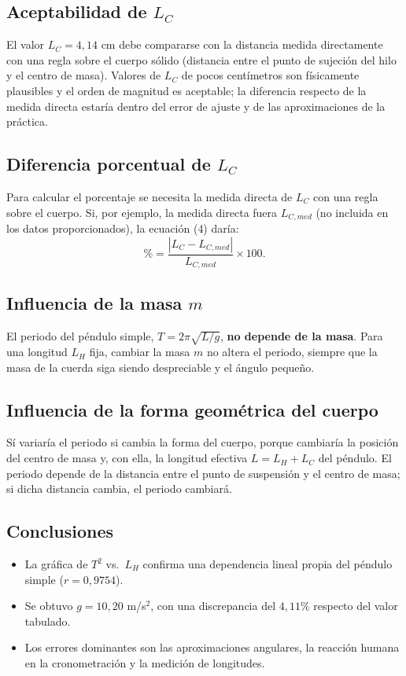 \documentclass[12pt,a4paper]{article}
\begin{document}
\subsection{Aceptabilidad de $L_C$}
El valor $L_C = 4,14$ cm debe compararse con la distancia medida directamente con una regla sobre el cuerpo s\'olido (distancia entre el punto de sujeci\'on del hilo y el centro de masa). Valores de $L_C$ de pocos cent\'imetros son f\'isicamente plausibles y el orden de magnitud es aceptable; la diferencia respecto de la medida directa estar\'ia dentro del error de ajuste y de las aproximaciones de la pr\'actica.

\subsection{Diferencia porcentual de $L_C$}
Para calcular el porcentaje se necesita la medida directa de $L_C$ con una regla sobre el cuerpo. Si, por ejemplo, la medida directa fuera $L_{C,med}$ (no incluida en los datos proporcionados), la ecuaci\'on (4) dar\'ia:
\begin{equation}
    \% = \frac{|L_C - L_{C,med}|}{L_{C,med}} \times 100.
\end{equation}

\subsection{Influencia de la masa $m$}
El periodo del p\'endulo simple, $T = 2\pi\sqrt{L/g}$, \textbf{no depende de la masa}. Para una longitud $L_H$ fija, cambiar la masa $m$ no altera el periodo, siempre que la masa de la cuerda siga siendo despreciable y el \'angulo peque\~no.

\subsection{Influencia de la forma geom\'etrica del cuerpo}
S\'i variar\'ia el periodo si cambia la forma del cuerpo, porque cambiar\'ia la posici\'on del centro de masa y, con ella, la longitud efectiva $L = L_H + L_C$ del p\'endulo. El periodo depende de la distancia entre el punto de suspensi\'on y el centro de masa; si dicha distancia cambia, el periodo cambiar\'a.

\subsection{Conclusiones}
\begin{itemize}
    \item La gr\'afica de $T^2$ vs.\ $L_H$ confirma una dependencia lineal propia del p\'endulo simple ($r = 0,9754$).
    \item Se obtuvo $g = 10,20$ m/s$^2$, con una discrepancia del $4,11\%$ respecto del valor tabulado.
    \item Los errores dominantes son las aproximaciones angulares, la reacci\'on humana en la cronometraci\'on y la medici\'on de longitudes.
\end{itemize}
\end{document}
